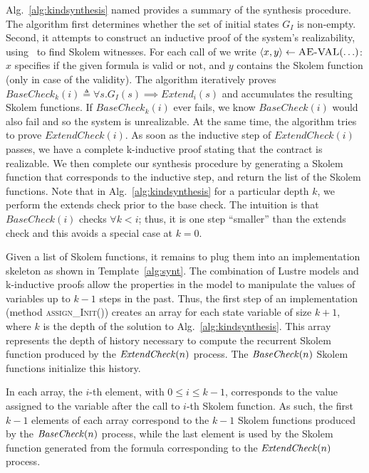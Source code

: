 Alg.~\ref{alg:kindsynthesis} named \jsyn provides a summary of the synthesis
procedure. The algorithm first determines whether the set of initial states $G_I$ is non-empty.
Second, it attempts to construct an inductive proof of the system's
realizability, using \aeval\ to find Skolem witnesses. For each call of \aeval we write $\langle x, y \rangle \gets \textsc{AE-VAL}(\ldots)$: $x$ specifies if the given formula is valid or not, and $y$ contains the Skolem function (only in case of the validity). The algorithm iteratively proves $\mathit{BaseCheck_k(i)} \triangleq \forall s. G_I(s) \implies \mathit{Extend}_i(s)$ and accumulates the resulting Skolem functions. If $\mathit{BaseCheck_k(i)}$ ever fails, we know $\mathit{BaseCheck(i)}$ would also fail and so the system is unrealizable. At the same time, the algorithm tries to prove $\mathit{ExtendCheck(i)}$. As soon as the inductive step of $\mathit{ExtendCheck(i)}$ passes, we have a complete k-inductive proof stating that the contract is realizable. We then complete our synthesis procedure by generating a Skolem function that
corresponds to the inductive step, and return the list of the Skolem functions.  Note that in Alg.~\ref{alg:kindsynthesis} for a particular depth $k$, we perform the extends check prior to the base check. The intuition is that $\mathit{BaseCheck(i)}$ checks $\forall k < i$; thus, it is one step ``smaller'' than the extends check and this avoids a special case at $k=0$.

Given a list of Skolem functions, it remains to plug them into
an implementation skeleton as shown in Template~\ref{alg:synt}.
The combination of Lustre models and k-inductive proofs
allow the properties in the model to manipulate the
 values of variables up to $k-1$ steps in the past. Thus,
the first step of an implementation  (method \textsc{assign\_Init()})
 creates an array for each state variable of size $k+1$, where
$k$ is the depth of the solution to Alg.~\ref{alg:kindsynthesis}.
This array represents the depth of history necessary to compute
the recurrent Skolem function produced by the ${\mathit {ExtendCheck}}(n)$ process.
The ${\mathit {BaseCheck}}(n)$ Skolem functions initialize this history.

In each array, the $i$-th element, with $0\leq i \leq k-1$,
corresponds to the value assigned to the variable after the call to
$i$-th Skolem function. As such, the first $k-1$ elements of each array
correspond to the $k-1$ Skolem functions produced by the
${\mathit {BaseCheck}}(n)$ process, while the last element is used by the
Skolem function generated from the formula corresponding to the
${\mathit {ExtendCheck}}(n)$ process.

